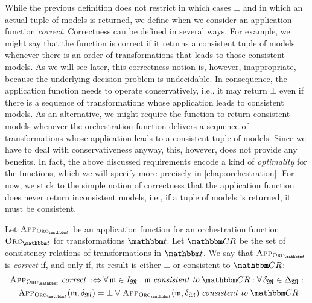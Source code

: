 While the previous definition does not restrict in which cases $\bot$ and in which an actual tuple of models is returned, we define when we consider an application function \emph{correct}.
Correctness can be defined in several ways.
For example, we might say that the function is correct if it returns a consistent tuple of models whenever there is an order of transformations that leads to those consistent models.
As we will see later, this correctness notion is, however, inappropriate, because the underlying decision problem is undecidable.
In consequence, the application function needs to operate conservatively, i.e., it may return $\bot$ even if there is a sequence of transformations whose application leads to consistent models.
As an alternative, we might require the function to return consistent models whenever the orchestration function delivers a sequence of transformations whose application leads to a consistent tuple of models.
Since we have to deal with conservativeness anyway, this, however, does not provide any benefits.
In fact, the above discussed requirements encode a kind of \emph{optimality} for the functions, which we will specify more precisely in \autoref{chap:orchestration}.
For now, we stick to the simple notion of correctness that the application function does never return inconsistent models, i.e., if a tuple of models is returned, it must be consistent.

\begin{definition}
    \label{def:applicationfunctioncorrectness}
    Let $\appfunction{\orcfunction{\transformationset{T}}}$ be an application function for an orchestration function $\orcfunction{\transformationset{T}}$ for transformations $\transformationset{T}$.
    Let $\consistencyrelationset{CR}$ be the set of consistency relations of transformations in $\transformationset{T}$.
    We say that $\appfunction{\orcfunction{\transformationset{T}}}$ is \emph{correct} if, and only if, its result is either $\bot$ or consistent to $\consistencyrelationset{CR}{}$:
    \begin{align*}
        &
        \appfunction{\orcfunction{\transformationset{T}}} \correctmath \equivalentperdefinition
        \forall \modeltuple{m} \in \metamodeltupleinstanceset{M} \mid \modeltuple{m} \consistenttomath \consistencyrelationset{CR} : \forall \changetuple{\metamodeltuple{M}} \in \changeuniverse{\metamodeltuple{M}} : \\
        & \formulaskip
        \appfunction{\orcfunction{\transformationset{T}}}(\modeltuple{m}, \changetuple{\metamodeltuple{M}}) = \bot \lor \appfunction{\orcfunction{\transformationset{T}}}(\modeltuple{m}, \changetuple{\metamodeltuple{M}}) \consistenttomath \consistencyrelationset{CR}
    \end{align*}
\end{definition}

